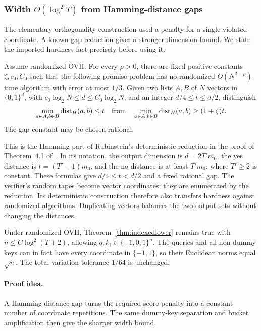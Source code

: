 \subsubsection{\texorpdfstring{Width $O(\log^2 T)$}{Quadratic logarithmic width} from Hamming-distance gaps}

The elementary orthogonality construction used a penalty for a single
violated coordinate.  A known gap reduction gives a stronger dimension
bound.  We state the imported hardness fact precisely before using it.

\begin{lemma}
\label{lem:gaphamminghardness}
Assume randomized OVH.  For every $\rho>0$, there are fixed positive
constants $\zeta,c_0,C_0$ such that the following promise problem has
no randomized $O(N^{2-\rho})$-time algorithm with error at most $1/3$.
Given two lists $A,B$ of $N$ vectors in $\{0,1\}^d$, with
$c_0\log_2N\le d\le C_0\log_2N$, and an integer
$d/4\le t\le d/2$, distinguish
\[
 \min_{a\in A,b\in B}\operatorname{dist}_H(a,b)\le t
 \quad\hbox{from}\quad
 \min_{a\in A,b\in B}\operatorname{dist}_H(a,b)\ge(1+\zeta)t.
\]
The gap constant may be chosen rational.
\end{lemma}

This is the Hamming part of Rubinstein's deterministic reduction in
the proof of Theorem~4.1 of~\cite{rubinstein2018ann}.  In its notation,
the output dimension is $d=2T'm_0$, the yes distance is
$t=(T'-1)m_0$, and the no distance is at least $T'm_0$, where $T'\ge2$
is constant.  These formulas give $d/4\le t<d/2$ and a fixed rational
gap.  The verifier's random tapes become vector coordinates; they are
enumerated by the reduction.  Its deterministic construction therefore
also transfers hardness against randomized algorithms.  Duplicating
vectors balances the two output sets without changing the distances.

\begin{theorem}
\label{thm:indexedlowerlogtwo}
Under randomized OVH, Theorem~\ref{thm:indexedlower} remains true with
$n\le C\log^2(T+2)$, allowing $q,k_i\in\{-1,0,1\}^n$.
The queries and all non-dummy keys can in fact have every coordinate
in $\{-1,1\}$, so their Euclidean norms equal $\sqrt n$.
The total-variation tolerance $1/64$ is unchanged.
\end{theorem}

\paragraph{Proof idea.}
A Hamming-distance gap turns the required score penalty into a constant number of coordinate repetitions.  The same dummy-key separation and bucket amplification then give the sharper width bound.

